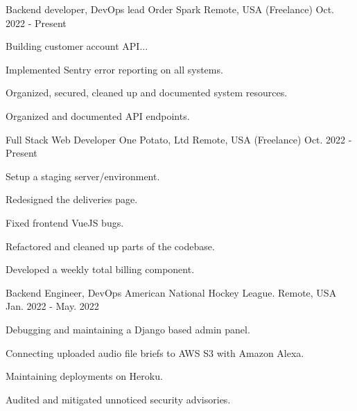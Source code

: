 

\begin{cventries}

  \cventry
    {Backend developer, DevOps lead} %
    {Order Spark} %
    {Remote, USA (Freelance)} %
    {Oct. 2022 - Present} %
    {
      \begin{cvitems} %
        \item {Building customer account API...}
        \item {Implemented Sentry error reporting on all systems.}
        \item {Organized, secured, cleaned up and documented system resources.}
        \item {Organized and documented API endpoints.}
      \end{cvitems}
    }

  \cventry
    {Full Stack Web Developer} %
    {One Potato, Ltd} %
    {Remote, USA (Freelance)} %
    {Oct. 2022 - Present} %
    {
      \begin{cvitems} %
        \item {Setup a staging server/environment.}
        \item {Redesigned the deliveries page.}
        \item {Fixed frontend VueJS bugs.}
        \item {Refactored and cleaned up parts of the codebase.}
        \item {Developed a weekly total billing component.}
      \end{cvitems}
    }

  \cventry
    {Backend Engineer, DevOps} %
    {American National Hockey League.} %
    {Remote, USA} %
    {Jan. 2022 - May. 2022} %
    {
      \begin{cvitems} %
        \item {Debugging and maintaining a Django based admin panel.}
        \item {Connecting uploaded audio file briefs to AWS S3 with Amazon Alexa.}
        \item {Maintaining deployments on Heroku.}
        \item {Audited and mitigated unnoticed security advisories.}
      \end{cvitems}
    }


\end{cventries}
